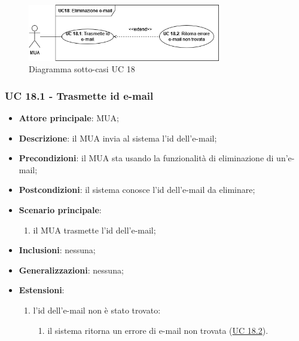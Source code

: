     \begin{figure}[H]
        \includegraphics[width=0.75\textwidth]{sections/uc_imgs/UC18.png}
        \centering
        \caption{Diagramma sotto-casi UC 18}
    \end{figure}


\subsubsection{UC 18.1 - Trasmette id e-mail} \label{sec:UC18.1}
\begin{itemize}
    \item \textbf{Attore principale}: MUA;
    \item \textbf{Descrizione}: il MUA invia al sistema l'id dell'e-mail;
    \item \textbf{Precondizioni}: il MUA sta usando la funzionalità di eliminazione di un'e-mail;
    \item \textbf{Postcondizioni}: il sistema conosce l'id dell'e-mail da eliminare;
    \item \textbf{Scenario principale}:
        \begin{enumerate}
            \item il MUA trasmette l'id dell'e-mail;
        \end{enumerate}
    \item \textbf{Inclusioni}: nessuna;
    \item \textbf{Generalizzazioni}: nessuna;
    \item \textbf{Estensioni}:
        \begin{enumerate}[label=\alph*.]
            \item l'id dell'e-mail non è stato trovato:
            \begin{enumerate}[label=\arabic*.]
                \item il sistema ritorna un errore di e-mail non trovata (\hyperref[sec:UC18.2]{UC 18.2}).
            \end{enumerate}
        \end{enumerate}
\end{itemize}


